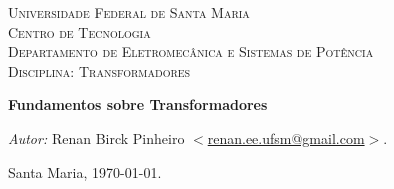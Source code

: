 \begin{titlepage}
\begin{center}

\textsc{\LARGE Universidade Federal de Santa Maria}\\[1.5cm]
\textsc{\Large Centro de Tecnologia}\\[0.5cm]
\textsc{\Large Departamento de Eletromecânica e Sistemas de Potência}\\[0.5cm]
\textsc{\Large Disciplina: Transformadores}\\[0.5cm]
\setlength{\oddsidemargin}{0pt} %
\setlength{\evensidemargin}{0pt} %
\setlength{\textwidth}{15cm}
\end{center}

\vspace*{5cm}
\begin{center}
{\huge \bfseries Fundamentos sobre Transformadores}\\[0.4cm]
\end{center}

\vspace*{130px}
\begin{flushright}

\emph{Autor:} Renan Birck Pinheiro $<$\url{renan.ee.ufsm@gmail.com}$>$. \newline



\end{flushright}
\begin{center}
Santa Maria, \today.

\end{center}


\end{titlepage}